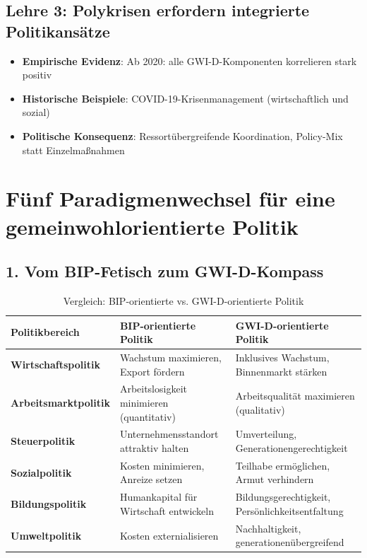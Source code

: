 \subsection{Lehre 3: Polykrisen erfordern integrierte Politikansätze}

\begin{itemize}
    \item \textbf{Empirische Evidenz}: Ab 2020: alle GWI-D-Komponenten korrelieren stark positiv
    \item \textbf{Historische Beispiele}: COVID-19-Krisenmanagement (wirtschaftlich und sozial)
    \item \textbf{Politische Konsequenz}: Ressortübergreifende Koordination, Policy-Mix statt Einzelmaßnahmen
\end{itemize}

\section{Fünf Paradigmenwechsel für eine gemeinwohlorientierte Politik}

\subsection{1. Vom BIP-Fetisch zum GWI-D-Kompass}

\begin{table}[ht]
    \centering
    \caption{Vergleich: BIP-orientierte vs. GWI-D-orientierte Politik}
    \label{tab:paradigmenwechsel_bip_gwi}
    \begin{tabular}{lp{6cm}p{6cm}}
        \toprule
        \textbf{Politikbereich} & \textbf{BIP-orientierte Politik} & \textbf{GWI-D-orientierte Politik} \\
        \midrule
        \textbf{Wirtschaftspolitik} & Wachstum maximieren, Export fördern & Inklusives Wachstum, Binnenmarkt stärken \\
        \textbf{Arbeitsmarktpolitik} & Arbeitslosigkeit minimieren (quantitativ) & Arbeitsqualität maximieren (qualitativ) \\
        \textbf{Steuerpolitik} & Unternehmensstandort attraktiv halten & Umverteilung, Generationengerechtigkeit \\
        \textbf{Sozialpolitik} & Kosten minimieren, Anreize setzen & Teilhabe ermöglichen, Armut verhindern \\
        \textbf{Bildungspolitik} & Humankapital für Wirtschaft entwickeln & Bildungsgerechtigkeit, Persönlichkeitsentfaltung \\
        \textbf{Umweltpolitik} & Kosten externialisieren & Nachhaltigkeit, generationenübergreifend \\
        \bottomrule
    \end{tabular}
\end{table}

